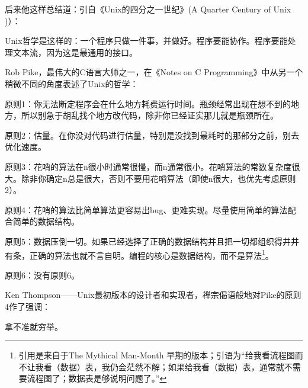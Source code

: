 \documentclass[12pt,oneside]{book}
\begin{document}
\begin{common-format}
后来他这样总结道：引自《Unix的四分之一世纪》(A Quarter Century of Unix \cite{Salus})）：

Unix哲学是这样的：一个程序只做一件事，并做好。程序要能协作。程序要能处理文本流，因为这是最通用的接口。
    
Rob Pike，最伟大的C语言大师之一，在《Notes on C  Programming》中从另一个稍微不同的角度表述了Unix的哲学\cite{Pike}：

原则1：你无法断定程序会在什么地方耗费运行时间。瓶颈经常出现在想不到的地方，所以别急于胡乱找个地方改代码，除非你已经证实那儿就是瓶颈所在。

原则2：估量。在你没对代码进行估量，特别是没找到最耗时的那部分之前，别去优化速度。

原则3：花哨的算法在n很小时通常很慢，而n通常很小。花哨算法的常数复杂度很大。除非你确定n总是很大，否则不要用花哨算法（即使n很大，也优先考虑原则2）。

原则4：花哨的算法比简单算法更容易出bug、更难实现。尽量使用简单的算法配合简单的数据结构。

原则5：数据压倒一切。如果已经选择了正确的数据结构并且把一切都组织得井井有条，正确的算法也就不言自明。编程的核心是数据结构，而不是算法\footnote{引用是来自于The Mythical Man-Month \cite{Brooks}早期的版本；引语为“给我看流程图而不让我看（数据）表，我仍会茫然不解；如果给我看（数据）表，通常就不需要流程图了；数据表是够说明问题了。”}。

原则6：没有原则6。

Ken Thompson——Unix最初版本的设计者和实现者，禅宗偈语般地对Pike的原则4作了强调：

拿不准就穷举。
    

\end{common-format}
\end{document}
